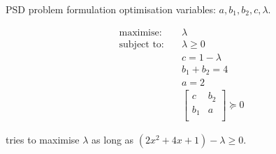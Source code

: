\begin{frame}{PSD problem formulation}
    optimisation variables: $a, b_1, b_2, c, \lambda$. \pause
    \begin{example}

       \begin{align*}
          \text{maximise:}\quad & \lambda\\
          \text{subject to:}\quad
                            & \lambda \geqslant 0\\
                            & c = 1 - \lambda\\
                            & b_1 + b_2 = 4\\
                            & a = 2\\
                            & \begin{bmatrix}
                                c   & b_2 \\
                                b_1 & a   \\
                              \end{bmatrix} \succcurlyeq 0
       \end{align*}
    \end{example}
  \pause
  tries to maximise $\lambda$ as long as $(2x^2 + 4x + 1) - \lambda \geqslant 0$.
\end{frame}

